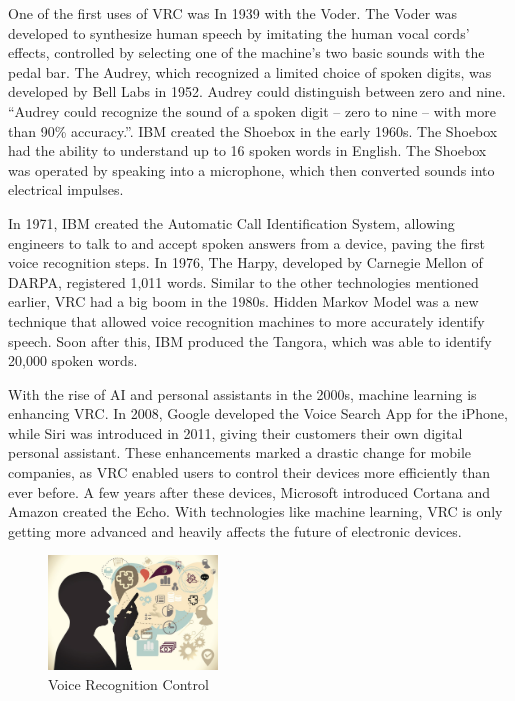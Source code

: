 \documentclass{article}
\begin{document}
One of the first uses of VRC was In 1939 with the Voder. The Voder was developed to synthesize human speech by imitating the human vocal cords’ effects, controlled by selecting one of the machine’s two basic sounds with the pedal bar. The Audrey, which recognized a limited choice of spoken digits, was developed by Bell Labs in 1952. Audrey could distinguish between zero and nine. “Audrey could recognize the sound of a spoken digit – zero to nine – with more than 90\% accuracy.”. IBM created the Shoebox in the early 1960s. The Shoebox had the ability to understand up to 16 spoken words in English. The Shoebox was operated by speaking into a microphone, which then converted sounds into electrical impulses.

In 1971, IBM created the Automatic Call Identification System, allowing engineers to talk to and accept spoken answers from a device, paving the first voice recognition steps. In 1976, The Harpy, developed by Carnegie Mellon of DARPA, registered 1,011 words. Similar to the other technologies mentioned earlier, VRC had a big boom in the 1980s. Hidden Markov Model was a new technique that allowed voice recognition machines to more accurately identify speech. Soon after this, IBM produced the Tangora, which was able to identify 20,000 spoken words. 

With the rise of AI and personal assistants in the 2000s, machine learning is enhancing VRC. In 2008, Google developed the Voice Search App for the iPhone, while Siri was introduced in 2011, giving their customers their own digital personal assistant. These enhancements marked a drastic change for mobile companies, as VRC enabled users to control their devices more efficiently than ever before. A few years after these devices, Microsoft introduced Cortana and Amazon created the Echo. With technologies like machine learning, VRC is only getting more advanced and heavily affects the future of electronic devices.
\cite{ref10}

\begin{figure}[!ht]
    \caption{Voice Recognition Control}
    \label{image:VRC}
    \centering
    \includegraphics[width=0.4\textwidth]{pics/vrc.jpg}
\end{figure}
\end{document}
